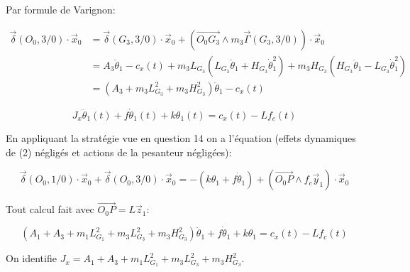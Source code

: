 \ifprof
\begin{corrige}
Par formule de Varignon:

\begin{align*}
\overrightarrow{\delta}(O_0,3/0)\cdot \overrightarrow{x}_0 &= \overrightarrow{\delta}(G_3,3/0)\cdot \overrightarrow{x}_0 + \left( \overrightarrow{O_0 G_3} \wedge m_3\overrightarrow{\Gamma}(G_3,3/0) \right)\cdot \overrightarrow{x}_0 \\
&= A_3 \ddot{\theta}_1 - c_x(t) +m_3L_{G_3}\left(L_{G_3}\ddot{\theta}_1 + H_{G_3}\dot{\theta}_1^2\right) + m_3 H_{G_3}\left(H_{G_3}\ddot{\theta}_1 - L_{G_3}\dot{\theta}_1^2\right)\\
&= \left(A_3 +m_3L_{G_3}^2 +m_3H_{G_3}^2\right) \ddot{\theta}_1 - c_x(t)
\end{align*}
 

\end{corrige}
\else
\fi

$$
J_{x} \ddot{\theta}_{1}(t)+f \dot{\theta}_{1}(t)+k \theta_{1}(t)=c_{x}(t)-L f_{c}(t)
$$
\ifprof
\begin{corrige}
En appliquant la stratégie vue en question 14 on a l'équation (effets dynamiques de (2) négligés et actions de la pesanteur négligées):

$$ \overrightarrow{\delta}(O_0,1/0)\cdot \overrightarrow{x}_0 + \overrightarrow{\delta}(O_0,3/0)\cdot \overrightarrow{x}_0 = -(k\theta_1 + f \dot{\theta}_1) + \left( \overrightarrow{O_0 P} \wedge f_c \overrightarrow{y}_1 \right)\cdot \overrightarrow{x}_0 $$ 

Tout calcul fait avec $\overrightarrow{O_0 P} = L \overrightarrow{z}_1$:

$$ \boxed{ \left( A_1 + A_3 + m_1 L_{G_1}^2 + m_3 L_{G_3}^2 + m_3 H_{G_3}^2 \right)\ddot{\theta}_1 + f \dot{\theta}_1 + k\theta_1 = c_x(t) -L f_c(t)} $$

On identifie $\boxed{J_x = A_1 + A_3 + m_1 L_{G_1}^2 + m_3 L_{G_3}^2 + m_3 H_{G_3}^2}$.

\end{corrige}
\else
\fi

